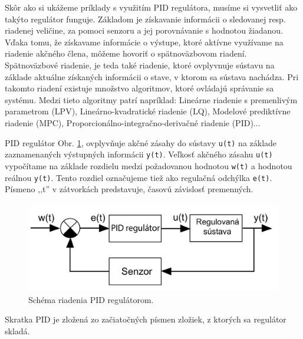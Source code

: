 Skôr ako si ukážeme príklady s využitím PID regulátora, musíme si vysvetliť ako takýto regulátor funguje. Základom je získavanie informácii o sledovanej resp. riadenej veličine, za pomoci senzoru a jej porovnávanie s hodnotou žiadanou. Vďaka tomu, že získavame informácie o výstupe, ktoré aktívne využívame na riadenie akčného člena, môžeme hovoriť o spätnoväzbovom riadení. Spätnoväzbové riadenie, je teda také riadenie, ktoré ovplyvnuje sústavu na základe aktuálne získaných informácii o stave, v ktorom sa sústava nachádza. Pri takomto riadení existuje množstvo algoritmov, ktoré ovládajú správanie sa systému. Medzi tieto algoritmy patrí napríklad: Lineárne riadenie s premenlivým parametrom (LPV), Lineárno-kvadratické riadenie (LQ), Modelové prediktívne riadenie (MPC), Proporcionálno-integračno-derivačné riadenie (PID)...

PID regulátor Obr. \ref{OBRAZOK 3.3}, ovplyvňuje akčné zásahy do sústavy \verb|u(t)| na základe zaznamenaných výstupných informácii \verb|y(t)|. Veľkosť akčného zásahu \verb|u(t)| vypočítame na základe rozdielu medzi požadovanou hodnotou \verb|w(t)| a hodnotou reálnou \verb|y(t)|. Tento rozdiel označujeme tiež ako regulačná odchýlka \verb|e(t)|. Písmeno ,,t'' v zátvorkách predstavuje, časovú závislosť premenných. 

\begin{figure}[!tbh]
	\centering
	\includegraphics[width=120mm]{obr/pid.png}
	\caption{Schéma riadenia PID regulátorom.}\label{OBRAZOK 3.3}
\end{figure}

Skratka PID je zložená zo začiatočných písmen zložiek, z ktorých sa regulátor skladá. 

